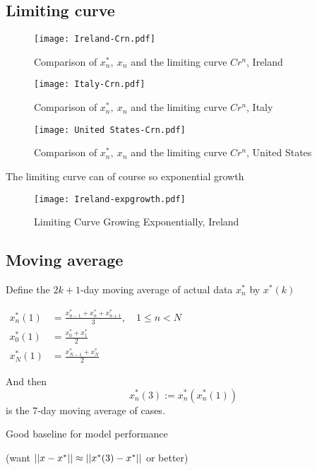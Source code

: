 \subsection{Limiting curve}

\begin{figure}[H]
\texttt{[image: Ireland-Crn.pdf]}
\endminipage 
\caption{Comparison of $x^*_n,\ x_n$ and the limiting curve $Cr^n$, Ireland}
\end{figure}

\begin{figure}[H]
\texttt{[image: Italy-Crn.pdf]}
\endminipage 
\caption{Comparison of $x^*_n,\ x_n$ and the limiting curve $Cr^n$, Italy}
\end{figure}

\begin{figure}[H]
\texttt{[image: United States-Crn.pdf]}
\endminipage 
\caption{Comparison of $x^*_n,\ x_n$ and the limiting curve $Cr^n$, United States}
\end{figure}

The limiting curve can of course so exponential growth 

\begin{figure}[H]
\texttt{[image: Ireland-expgrowth.pdf]}
\endminipage 
\caption{Limiting Curve Growing Exponentially, Ireland}
\end{figure}

\subsection{Moving average}

Define the $2k+1$-day moving average of actual data $x_n^*$ by $x^*(k)$

$\begin{aligned}
x^*_n(1) &=\frac{x^*_{n-1} + x^*_n + x^*_{n+1}}{3},\quad 1\leq n < N \\
x^*_0(1) &=\frac{x^*_0 + x^*_1}{2}\\
x^*_N(1) &=\frac{x^*_{N-1} + x^*_N}{2}
\end{aligned}$

And then $$x_n^*(3):= x^*_n(x^*_n(1))$$ is the 7-day moving average of cases.

Good baseline for model performance 

(want $\left|\left|x-x^*\right|\right|\approx\left|\left|x^*(3)-x^*\right|\right|$ or better)

